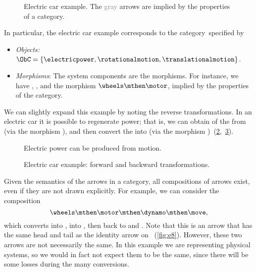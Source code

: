 \begin{figure}[h!]
	\centering
	\caption{
		Electric car example.
		The \textcolor{gray}{gray} arrows are implied by the properties of a category.
	}
	\label{fig:e5}
\end{figure}

In particular, the electric car example corresponds to the category~\CatC specified by
\begin{itemize}
	\item \emph{Objects:} $\ObC=\{ \electricpower,\rotationalmotion,\translationalmotion\}$.
	\item \emph{Morphisms}: The system components are the morphisms.
	      For instance, we have \motor, \wheels, and the morphism $\wheels \mthen \motor$, implied by the properties of the category.
\end{itemize}

We can slightly expand this example by noting the reverse transformations.
In an electric car it is possible to regenerate power; that is, we can obtain \rotationalmotion of the \wheels from
\translationalmotion (via the morphism \move), and then convert the \rotationalmotion into \electricpower (via the morphism \dynamo)~(\cref{fig:e6},~\cref{fig:e6-together}).

\begin{figure}[h!]
	\centering
	\caption{Electric power can be produced from motion.}
	\label{fig:e6}
\end{figure}

\begin{figure}[h!]
	\centering
	\caption{Electric car example: forward and backward transformations.\label{fig:e6-together}}
\end{figure}

Given the semantics of the arrows in a category, all compositions of arrows exist, even if they are not drawn explicitly.
For example, we can consider the composition
%
\begin{equation*}
	\wheels \mthen \motor \mthen \dynamo \mthen \move,
\end{equation*}
%
which converts \translationalmotion into \rotationalmotion, into \electricpower, then back to \rotationalmotion and \translationalmotion.
Note that this is an arrow that has the same head and tail as the identity arrow on \translationalmotion~(\cref{fig:e8}).
However, these two arrows are not necessarily the same.
In this example we are representing physical systems, so we would in fact not expect them to be the same, since there will be some losses during the many conversions.

